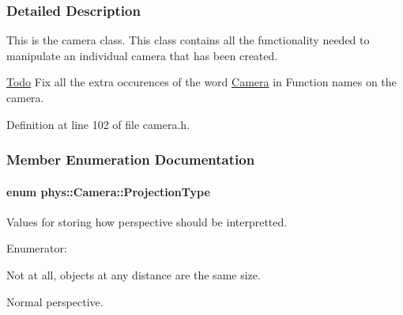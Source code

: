 \subsubsection{Detailed Description}
This is the camera class. This class contains all the functionality needed to manipulate an individual camera that has been created. \begin{Desc}
\item[\hyperlink{todo__todo000006}{Todo}]Fix all the extra occurences of the word \hyperlink{classphys_1_1Camera}{Camera} in Function names on the camera. \end{Desc}


Definition at line 102 of file camera.h.



\subsubsection{Member Enumeration Documentation}
\hypertarget{classphys_1_1Camera_a87d8d46e9eb2080b10712079be69d86a}{
\paragraph[{ProjectionType}]{\setlength{\rightskip}{0pt plus 5cm}enum {\bf phys::Camera::ProjectionType}}\hfill}
\label{classphys_1_1Camera_a87d8d46e9eb2080b10712079be69d86a}


Values for storing how perspective should be interpretted. 

\begin{Desc}
\item[Enumerator: ]\par
\begin{description}
\item[{\em 
\hypertarget{classphys_1_1Camera_a87d8d46e9eb2080b10712079be69d86aa6a71e6ab2139c8fc4d48d64aa9717f02}{
Orthographic}
\label{classphys_1_1Camera_a87d8d46e9eb2080b10712079be69d86aa6a71e6ab2139c8fc4d48d64aa9717f02}
}]Not at all, objects at any distance are the same size. \item[{\em 
\hypertarget{classphys_1_1Camera_a87d8d46e9eb2080b10712079be69d86aacfe21986c8c655b8d19ebd76118de055}{
Perspective}
\label{classphys_1_1Camera_a87d8d46e9eb2080b10712079be69d86aacfe21986c8c655b8d19ebd76118de055}
}]Normal perspective. \end{description}
\end{Desc}



